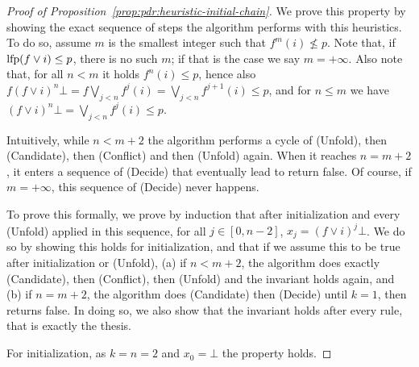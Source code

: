 \begin{proof}[Proof of Proposition~\ref{prop:pdr:heuristic-initial-chain}]
	We prove this property by showing the exact sequence of steps the algorithm performs with this heuristics. To do so, assume $m$ is the smallest integer such that $f^m (i) \not \leq p$. Note that, if $\text{lfp} (f \lor i) \leq p$, there is no such $m$; if that is the case we say $m = +\infty$. Also note that, for all $n < m$ it holds $f^n (i) \leq p$, hence also $f (f \lor i)^n \bot = f \bigvee\limits_{j < n} f^j (i) = \bigvee\limits_{j < n} f^{j+1} (i) \leq p$, and for $n \leq m$ we have $(f \lor i)^n \bot = \bigvee\limits_{j < n} f^j (i) \leq p$.

	Intuitively, while $n < m + 2$ the algorithm performs a cycle of (Unfold), then (Candidate), then (Conflict) and then (Unfold) again. When it reaches $n = m + 2$, it enters a sequence of (Decide) that eventually lead to return false. Of course, if $m = + \infty$, this sequence of (Decide) never happens.

	To prove this formally, we prove by induction that after initialization and every (Unfold) applied in this sequence, for all $j \in [0,n-2]$, $x_j=(f\lor i)^{j}\bot$. We do so by showing this holds for initialization, and that if we assume this to be true after initialization or (Unfold), (a) if $n < m + 2$, the algorithm does exactly (Candidate), then (Conflict), then (Unfold) and the invariant holds again, and (b) if $n = m + 2$, the algorithm does (Candidate) then (Decide) until $k = 1$, then returns false. In doing so, we also show that the invariant holds after every rule, that is exactly the thesis.

	For initialization, as $k = n = 2$ and $x_0 = \bot$ the property holds.


\end{proof}
